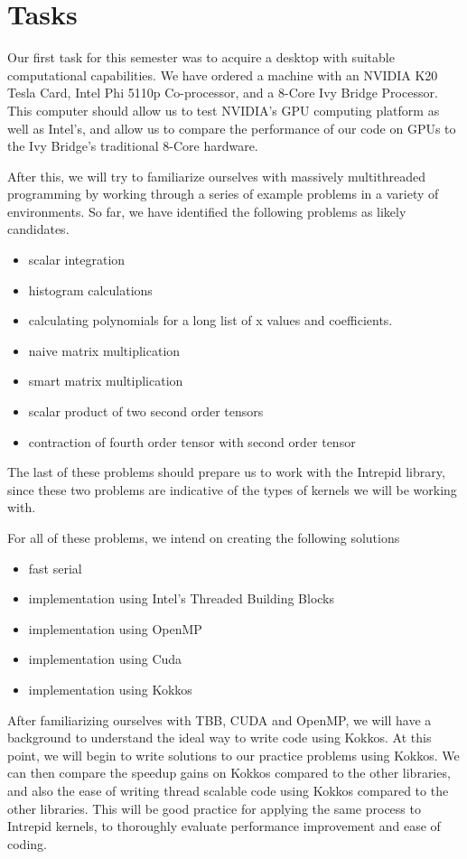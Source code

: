 \documentclass[proposal]{hmcclinic}
\begin{document}
\section{Tasks}

Our first task for this semester was to acquire a desktop with suitable
computational capabilities. We have ordered a machine with an NVIDIA K20 Tesla
Card, Intel Phi 5110p Co-processor, and a 8-Core Ivy Bridge Processor. This
computer should allow us to test NVIDIA's GPU computing platform as well as
Intel's, and allow us to compare the performance of our code on GPUs to the Ivy
Bridge's traditional
8-Core hardware.

After this, we will try to familiarize ourselves with massively multithreaded
programming by working through a series of example problems in a variety of
environments. So far, we have identified the following problems as likely candidates.
\begin{itemize}
	\item scalar integration
	\item histogram calculations
	\item calculating polynomials for a long list of x values and coefficients.
	\item naive matrix multiplication
	\item smart matrix multiplication
	\item scalar product of two second order tensors
	\item contraction of fourth order tensor with second order tensor
\end{itemize}
The last of these problems should prepare us to work with the Intrepid library, since these
two problems are indicative of the types of kernels we will be working with.

For all of these problems, we intend on creating the following solutions
\begin{itemize}
	\item fast serial
	\item implementation using Intel's Threaded Building Blocks
	\item implementation using OpenMP
	\item implementation using Cuda
	\item implementation using Kokkos
\end{itemize}
After familiarizing ourselves with TBB, CUDA and OpenMP, we will have a
background to understand the ideal way to write code using Kokkos. At this
point, we will begin to write solutions to our practice problems using Kokkos.
We can then compare the speedup gains on Kokkos compared to the other libraries,
and also the ease of writing thread scalable code using Kokkos compared to the
other libraries. This will be good practice for applying the same process to
Intrepid kernels, to thoroughly evaluate performance improvement and ease of
coding.
\end{document}
